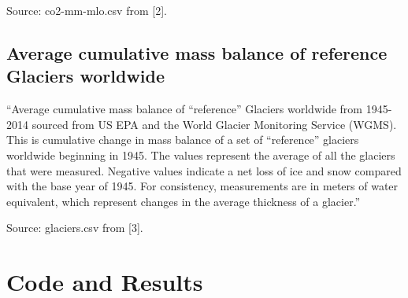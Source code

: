 \documentclass[11pt]{article}
\providecommand{\tightlist}{%
      \setlength{\itemsep}{0pt}\setlength{\parskip}{0pt}}
\begin{document}
Source: co2-mm-mlo.csv from [2]. %


\subsection{Average cumulative mass balance of reference Glaciers worldwide}

``Average cumulative mass balance of ``reference'' Glaciers worldwide
from 1945-2014 sourced from US EPA and the World Glacier Monitoring
Service (WGMS). This is cumulative change in mass balance of a set of
``reference'' glaciers worldwide beginning in 1945. The values
represent the average of all the glaciers that were measured. Negative
values indicate a net loss of ice and snow compared with the base year
of 1945. For consistency, measurements are in meters of water
equivalent, which represent changes in the average thickness of a
glacier.''

Source: glaciers.csv from [3]. %

    \hypertarget{result}{%
\section{Code and Results}\label{result}}

\end{document}
